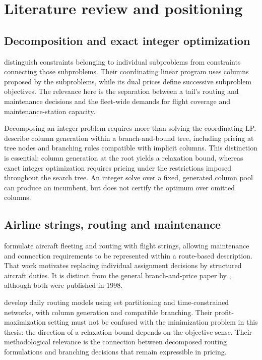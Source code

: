 \section{Literature review and positioning}
\label{sec:bp_literature}

\subsection{Decomposition and exact integer optimization}

\citet{dantzig1960decomposition} distinguish constraints belonging to individual
subproblems from constraints connecting those subproblems. Their coordinating
linear program uses columns proposed by the subproblems, while its dual prices
define successive subproblem objectives. The relevance here is the separation
between a tail's routing and maintenance decisions and the fleet-wide demands
for flight coverage and maintenance-station capacity.

Decomposing an integer problem requires more than solving the coordinating LP.
\citet{barnhart1998branchprice} describe column generation within a
branch-and-bound tree, including pricing at tree nodes and branching rules
compatible with implicit columns. This distinction is essential: column
generation at the root yields a relaxation bound, whereas exact integer
optimization requires pricing under the restrictions imposed throughout the
search tree. An integer solve over a fixed, generated column pool can produce
an incumbent, but does not certify the optimum over omitted columns.

\subsection{Airline strings, routing and maintenance}

\citet{barnhart1998flight} formulate aircraft fleeting and routing with flight
strings, allowing maintenance and connection requirements to be represented
within a route-based description. That work motivates replacing individual
assignment decisions by structured aircraft duties. It is distinct from the
general branch-and-price paper by \citet{barnhart1998branchprice}, although both
were published in 1998.

\citet{desaulniers1997daily} develop daily routing models using
set partitioning and time-constrained networks, with column
generation and compatible branching. Their profit-maximization setting must
not be confused with the minimization problem in this thesis: the direction
of a relaxation bound depends on the objective sense. Their methodological
relevance is the connection between decomposed routing formulations and
branching decisions that remain expressible in pricing.

